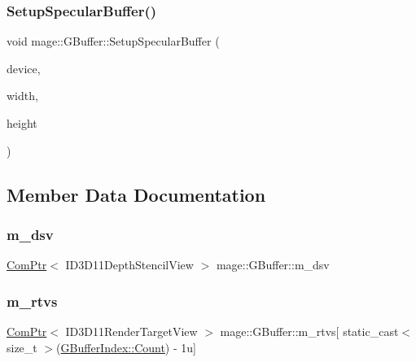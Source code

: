 \subsubsection{\texorpdfstring{Setup\+Specular\+Buffer()}{SetupSpecularBuffer()}}
{\footnotesize\ttfamily void mage\+::\+G\+Buffer\+::\+Setup\+Specular\+Buffer (\begin{DoxyParamCaption}\item[{I\+D3\+D11\+Device2 $\ast$}]{device,  }\item[{\hyperlink{namespacemage_af2b398bf98eb10351f49cad73fe2cc73}{u32}}]{width,  }\item[{\hyperlink{namespacemage_af2b398bf98eb10351f49cad73fe2cc73}{u32}}]{height }\end{DoxyParamCaption})\hspace{0.3cm}{\ttfamily [private]}}



\subsection{Member Data Documentation}
\hypertarget{structmage_1_1_g_buffer_a75ef598ba704be52788b7d6c9efe26e7}{}\label{structmage_1_1_g_buffer_a75ef598ba704be52788b7d6c9efe26e7} 
\subsubsection{\texorpdfstring{m\+\_\+dsv}{m\_dsv}}
{\footnotesize\ttfamily \hyperlink{namespacemage_ae74f374780900893caa5555d1031fd79}{Com\+Ptr}$<$ I\+D3\+D11\+Depth\+Stencil\+View $>$ mage\+::\+G\+Buffer\+::m\+\_\+dsv\hspace{0.3cm}{\ttfamily [private]}}

\hypertarget{structmage_1_1_g_buffer_a323230c320cc2de8ec9e2fb7aea45e92}{}\label{structmage_1_1_g_buffer_a323230c320cc2de8ec9e2fb7aea45e92} 
\subsubsection{\texorpdfstring{m\+\_\+rtvs}{m\_rtvs}}
{\footnotesize\ttfamily \hyperlink{namespacemage_ae74f374780900893caa5555d1031fd79}{Com\+Ptr}$<$ I\+D3\+D11\+Render\+Target\+View $>$ mage\+::\+G\+Buffer\+::m\+\_\+rtvs\mbox{[} static\+\_\+cast$<$ size\+\_\+t $>$(\hyperlink{structmage_1_1_g_buffer_a72f0fc0f46052fdc9872c48c57894607ae93f994f01c537c4e2f7d8528c3eb5e9}{G\+Buffer\+Index\+::\+Count}) -\/ 1u\mbox{]}\hspace{0.3cm}{\ttfamily [private]}}

